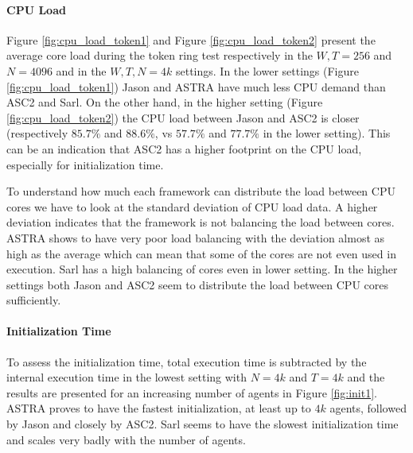 \paragraph{CPU Load} Figure \ref{fig:cpu_load_token1} and Figure \ref{fig:cpu_load_token2} present the average core load during the token ring test respectively in the $W,T=256$ and $N=4096$ and in the $W,T,N=4k$ settings. %
In the lower settings (Figure \ref{fig:cpu_load_token1}) Jason and ASTRA have much less CPU demand than ASC2 and Sarl. On the other hand, in the higher setting (Figure \ref{fig:cpu_load_token2}) the CPU load between Jason and ASC2 is closer (respectively $85.7\%$ and $88.6\%$, vs $57.7\%$ and $77.7\%$ in the lower setting). %
This can be an indication that ASC2 has a higher footprint on the CPU load, especially for initialization time. 

To understand how much each framework can distribute the load between CPU cores we have to look at the standard deviation of CPU load data. A higher deviation %
indicates that the framework is not balancing the load between cores. ASTRA shows to have very poor load balancing with the deviation almost as high as the average which can mean that some of the cores are not even used in execution. Sarl has a high balancing of cores even in lower setting. In the higher settings both Jason and ASC2 seem to distribute the load between CPU cores sufficiently.

\paragraph{Initialization Time}
To assess the initialization time, total execution time is subtracted by the internal execution time in the lowest setting with $N=4k$ and $T=4k$ and the results are presented for an increasing number of agents in Figure \ref{fig:init1}. ASTRA proves to have the fastest initialization, at least up to $4k$ agents, followed by Jason and closely by ASC2. Sarl seems to have the slowest initialization time and scales very badly with the number of agents. 

